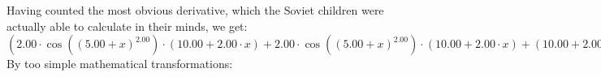 \documentclass{article}
\begin{document}
 \newline
 \newline 
Having counted the most obvious derivative, which the Soviet children were actually able to calculate in their minds, we get:
$({{{2.00} \cdot { \cos {\left({\left({{5.00} + {x}}\right) ^ {2.00}}\right)}  \cdot \left({{10.00} + {{2.00} \cdot {x}}}\right)}} + {{{2.00} \cdot { \cos {\left({\left({{5.00} + {x}}\right) ^ {2.00}}\right)}  \cdot \left({{10.00} + {{2.00} \cdot {x}}}\right)}} + {\left({{10.00} + {{2.00} \cdot {x}}}\right) \cdot \left({{\left({-1.00}\right) \cdot {\left({{10.00} + {{2.00} \cdot {x}}}\right) \cdot {\left({{10.00} + {{2.00} \cdot {x}}}\right) \cdot  \sin {\left({\left({{5.00} + {x}}\right) ^ {2.00}}\right)} }}} + {{2.00} \cdot  \cos {\left({\left({{5.00} + {x}}\right) ^ {2.00}}\right)} }}\right)}}})'(x) = {{{\left({-2.00}\right) \cdot {\left({{10.00} + {{2.00} \cdot {x}}}\right) \cdot {\left({{10.00} + {{2.00} \cdot {x}}}\right) \cdot  \sin {\left({\left({{5.00} + {x}}\right) ^ {2.00}}\right)} }}} + {{4.00} \cdot  \cos {\left({\left({{5.00} + {x}}\right) ^ {2.00}}\right)} }} + {{{\left({-2.00}\right) \cdot {\left({{10.00} + {{2.00} \cdot {x}}}\right) \cdot {\left({{10.00} + {{2.00} \cdot {x}}}\right) \cdot  \sin {\left({\left({{5.00} + {x}}\right) ^ {2.00}}\right)} }}} + {{4.00} \cdot  \cos {\left({\left({{5.00} + {x}}\right) ^ {2.00}}\right)} }} + {{{\left({-2.00}\right) \cdot {\left({{10.00} + {{2.00} \cdot {x}}}\right) \cdot {\left({{10.00} + {{2.00} \cdot {x}}}\right) \cdot  \sin {\left({\left({{5.00} + {x}}\right) ^ {2.00}}\right)} }}} + {{4.00} \cdot  \cos {\left({\left({{5.00} + {x}}\right) ^ {2.00}}\right)} }} + {\left({{10.00} + {{2.00} \cdot {x}}}\right) \cdot \left({{{\left({-2.00}\right) \cdot {\left({{10.00} + {{2.00} \cdot {x}}}\right) \cdot  \sin {\left({\left({{5.00} + {x}}\right) ^ {2.00}}\right)} }} - {\left({{10.00} + {{2.00} \cdot {x}}}\right) \cdot \left({{{2.00} \cdot  \sin {\left({\left({{5.00} + {x}}\right) ^ {2.00}}\right)} } + {\left({{10.00} + {{2.00} \cdot {x}}}\right) \cdot { \cos {\left({\left({{5.00} + {x}}\right) ^ {2.00}}\right)}  \cdot \left({{10.00} + {{2.00} \cdot {x}}}\right)}}}\right)}} - {{2.00} \cdot {\left({{10.00} + {{2.00} \cdot {x}}}\right) \cdot  \sin {\left({\left({{5.00} + {x}}\right) ^ {2.00}}\right)} }}}\right)}}}}$\newline
\newline
By too simple mathematical transformations:
\end{document}
